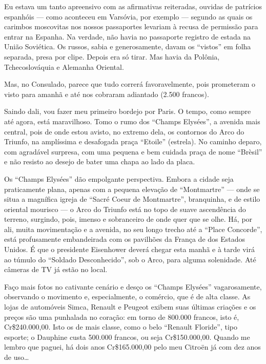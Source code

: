Eu estava um tanto apreensivo com as afirmativas reiteradas, ouvidas de patrícios espanhóis --- como aconteceu em Varsóvia, por exemplo --- segundo as quais os carimbos moscovitas nos nossos passaportes levariam à recusa de permissão para entrar na Espanha. Na verdade, não havia no passaporte registro de estada na União Soviética. Os russos, sabia e generosamente, davam os ``vistos'' em folha separada, presa por clipe. Depois era só tirar. Mas havia da Polônia, Tchecoslováquia e Alemanha Oriental.

Mas, no Consulado, parece que tudo correrá favoravelmente, pois prometeram o visto para amanhã e até nos cobraram adiantado (2.500 francos).

Saindo dali, vou fazer meu primeiro bordejo por Paris. O tempo, como sempre até agora, está maravilhoso. Tomo o rumo dos ``Champs Elysées'', a avenida mais central, pois de onde estou avisto, no extremo dela, os contornos do Arco do Triunfo, na amplíssima e desafogada praça ``Etoile'' (estrela). No caminho deparo, com agradável surpresa, com uma pequena e bem cuidada praça de nome ``Brèsil'' e não resisto ao desejo de bater uma chapa ao lado da placa.

Os ``Champs Elysées'' dão empolgante perspectiva. Embora a cidade seja praticamente plana, apenas com a pequena elevação de ``Montmartre'' --- onde se situa a magnífica igreja de ``Sacré Coeur de Montmartre'', branquinha, e de estilo oriental mourisco --- o Arco do Triunfo está no topo de suave ascendência do terreno, surgindo, pois, imenso e sobranceiro de onde quer que se olhe. Há, por ali, muita movimentação e a avenida, no seu longo trecho até a ``Place Concorde'', está profusamente embandeirada com os pavilhões da França de dos Estados Unidos. É que o presidente Eisenhower deverá chegar esta manhã e à tarde virá ao túmulo do ``Soldado Desconhecido'', sob o Arco, para alguma solenidade. Até câmeras de TV já estão no local.

Faço mais fotos no cativante cenário e desço os ``Champs Elysées'' vagarosamente, observando o movimento e, especialmente, o comércio, que é de alta classe. As lojas de automóveis Simca, Renault e Peugeot exibem suas últimas criações e os preços são uma punhalada no coração: em torno de 800.000 francos, isto é, Cr\$240.000,00. Isto os de mais classe, como o belo ``Renault Floride'', tipo esporte; o Dauphine custa 500.000 francos, ou seja Cr\$150.000,00. Quando me lembro que paguei, há dois anos Cr\$165.000,00 pelo meu Citroën já com dez anos de uso\ldots

